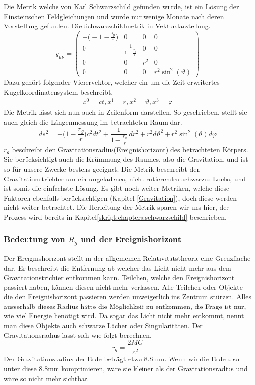 \begin{refsection}
	Die Metrik welche von Karl Schwarzschild gefunden wurde, ist ein Lösung der Einsteinschen Feldgleichungen und wurde nur wenige Monate nach deren Vorstellung gefunden.
	Die Schwarzschildmetrik in Vektordarstellung:
	\begin{equation}
	g_{\mu\nu}=
	\begin{pmatrix}
	-\biggl(-1-\frac{r_{g}}{r}\biggr) & 0 & 0 & 0 \\
	0 & \frac{1}{\displaystyle1-\frac{r_{g}}{r}} & 0 & 0 \\
	0 & 0 & r^{2} & 0 \\
	0 & 0 & 0 & r^{2}\sin^{2}(\vartheta)
	\end{pmatrix}
	\end{equation}
	Dazu gehört folgender Vierervektor, welcher ein um die Zeit erweitertes Kugelkoordinatensystem beschreibt.
	\begin{align*}
	x^{0}=ct,
	x^{1}=r,
	x^{2}=\vartheta,
	x^{3}=\varphi
	\end{align*}
	Die Metrik lässt sich nun auch in Zeilenform darstellen. So geschrieben, stellt sie auch gleich die Längenmessung im betrachteten Raum dar.
	\begin{equation}
	ds^2
	=
	-\biggl(1-\frac{r_g}r\biggr)c^2dt^2
	+
	\frac{1}{\displaystyle 1-\frac{r_g}r}\,dr^2 
	+
	r^2d\vartheta^2 
	+ 
	r^2\sin^2(\vartheta)d\varphi
	\end{equation}
	$r_g$ beschreibt den Gravitationsradius(Ereignishorizont) des betrachteten Körpers.
	Sie berücksichtigt auch die Krümmung des Raumes, also die Gravitation, und ist so für unsere Zwecke bestens geeignet. Die Metrik beschreibt den Gravitationstrichter um ein ungeladenes, nicht rotierendes schwarzes Lochs, und ist somit die einfachste Lösung. Es gibt noch weiter Metriken, welche diese Faktoren ebenfalls berücksichtigen (Kapitel \ref{Gravitation}), doch diese werden nicht weiter betrachtet.
	Die Herleitung der Metrik sparen wir uns hier, der Prozess wird bereits in Kapitel\ref{skript:chapters:schwarzschild} beschrieben.
	\subsubsection{Bedeutung von $R_{g}$ und der Ereignishorizont}
	Der Ereignishorizont stellt in der allgemeinen Relativitätstheorie eine Grenzfläche dar. Er beschreibt die Entfernung ab welcher das Licht nicht mehr aus dem Gravitationstrichter entkommen kann. Teilchen, welche den Ereignishorizont passiert haben, können diesen nicht mehr verlassen. Alle Teilchen oder Objekte die den Ereignishorizont passieren werden unweigerlich ins Zentrum stürzen. Alles ausserhalb dieses Radius hätte die Möglichkeit zu entkommen, die Frage ist nur, wie viel Energie benötigt wird. Da sogar das Licht nicht mehr entkommt, nennt man diese Objekte auch schwarze Löcher oder Singularitäten.
	Der Gravitationsradius lässt sich wie folgt berechnen.
	\begin{equation} \label{Gravitationsradius}
	r_{g}= \frac{2MG}{c^2}
	\end{equation}
	Der Gravitationsradius der Erde beträgt etwa 8.8mm. Wenn wir die Erde also unter diese 8.8mm komprimieren, wäre sie kleiner als der Gravitationsradius und wäre so nicht mehr sichtbar.

\end{refsection}
